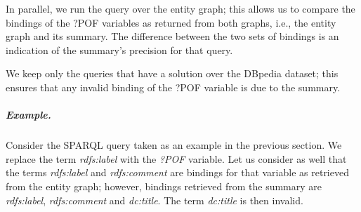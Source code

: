 In parallel, we run the query over the entity graph; this allows us to compare the bindings of the ?POF variables as returned from both graphs, i.e., the entity graph and its summary. The difference between the two sets of bindings is an indication of the summary's precision for that query.

We keep only the queries that have a solution over the DBpedia dataset; this ensures that any invalid binding of the ?POF variable is due to the summary.

\subparagraph{Example.}

Consider the SPARQL query taken as an example in the previous section. We replace the term \emph{rdfs:label} with the \emph{?POF} variable. Let us consider as well that the terms \emph{rdfs:label} and \emph{rdfs:comment} are bindings for that variable as retrieved from the entity graph; however, bindings retrieved from the summary are \emph{rdfs:label}, \emph{rdfs:comment} and \emph{dc:title}. The term \emph{dc:title} is then invalid.

